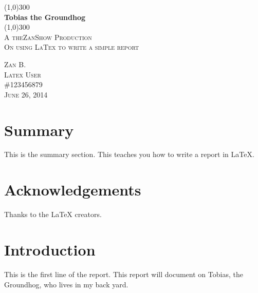 \documentclass{article}
\begin{document}
\begin{titlepage}
    \begin{center}
        \line(1,0){300}\\
        [2mm]
        \huge{\bfseries Tobias the Groundhog}\\
        [2mm]
        \line(1,0){300}\\
        [1.5cm]
        \textsc{\LARGE A theZanShow Production}\\
        [0.75cm]
        \textsc{\Large On using LaTex to write a simple report}\\
        [10cm]
    \end{center}
    \begin{flushright}
        \textsc{\large Zan B.\\
        Latex User\\
        \#123456879\\
        June 26, 2014 \\}
    \end{flushright}
\end{titlepage}

\section*{Summary}
This is the summary section. This teaches you how to write a report in LaTeX.
\cleardoublepage

\section*{Acknowledgements}
Thanks to the LaTeX creators.
\cleardoublepage

\tableofcontents
\thispagestyle{empty}
\cleardoublepage

\listoffigures
{}
\cleardoublepage

\listoftables
{}
\cleardoublepage

\setcounter{page}{1}

\section{Introduction}\label{sec:intro}
This is the first line of the report. This report will document on Tobias, the Groundhog, who lives in my back yard.
\end{document}
